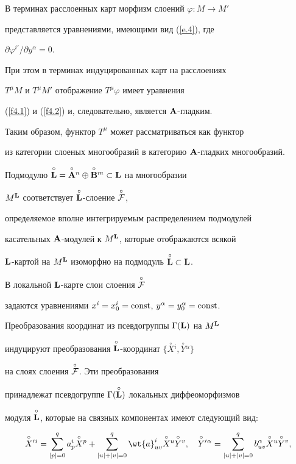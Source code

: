 В терминах расслоенных карт морфизм слоений $\varphi:M\to M'$


представляется уравнениями, имеющими вид (\ref{e.4}), где


$\partial\varphi^{i'}/\partial y^\alpha=0$.


При этом в терминах индуцированных карт на расслоениях


$T^\mu M$ и $T^\mu M'$ отображение $T^\mu\varphi$ имеет уравнения


(\ref{f4.1}) и (\ref{f4.2}) и, следовательно, является ${\bold A}$-гладким.


Таким образом, функтор $T^\mu$ может рассматриваться как функтор


из категории слоеных многообразий в категорию ${\bold A}$-гладких многообразий.





Подмодулю $\Lo=\overset{\circ}{\bold A}{}^n\oplus


\overset{\circ}{\bold B}{}^m\subset\L$ на многообразии


$M^{\bold L}$ соответствует $\overset{\circ}{\bold L}{}$-слоение $\overset{\circ}{\cal F}{}$,


определяемое вполне интегрируемым распределением подмодулей 


касательных ${\bold A}$-модулей к $M^{\bold L}$, которые отображаются всякой


${\bold L}$-картой на $M^{\bold L}$ изоморфно на подмодуль $\overset{\circ}{\bold L}{}\subset{\bold L}$.


В локальной ${\bold L}$-карте слои слоения $\overset{\circ}{\cal F}{}$


задаются уравнениями $x^i=x^i_0=\operatorname{const}$, $y^\alpha=y^\alpha_0=\operatorname{const}$.


Преобразования координат из псевдогруппы $\Gamma({\bold L})$ на $M^{\bold L}$


индуцируют преобразования $\overset{\circ}{\bold L}{}$-координат $\{\overset{\circ}{X}{}^i,\overset{\circ}{Y}{}^\alpha\}$


на слоях слоения $\overset{\circ}{\cal F}{}$. Эти преобразования


принадлежат псевдогруппе $\Gamma(\overset{\circ}{\bold L}{})$ локальных диффеоморфизмов


модуля $\overset{\circ}{\bold L}{}$, которые на связных компонентах имеют следующий вид:


\begin{equation} \label{a.2}


\overset{\circ}{X}{}'{}^i=\sum^q_{|p|=0}


a^i_p \Xop+\sum^q_{|u|+|v|=0}


{\wt{a}}^i_{uv}\overset{\circ}{X}{}^u\overset{\circ}{Y}{}^v, \quad


\overset{\circ}{Y}{}'{}^\alpha


=\sum^q_{|u|+|v|=0}b^\alpha_{uv}\overset{\circ}{X}{}^u\overset{\circ}{Y}{}^v,


\end{equation}


